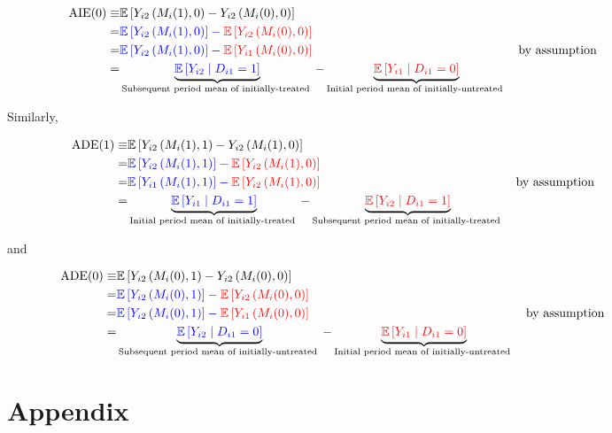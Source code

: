 \documentclass[10pt]{article}
\begin{document}
\begin{align}
    \text{AIE}(0) \equiv &\mathbb{E}\left[Y_{i 2}\left(M_i(1), 0\right)-Y_{i 2}\left(M_i(0), 0\right)\right] \\
    = &\color{blue}{\mathbb{E}\left[Y_{i 2}\left(M_i(1), 0\right)\right]} - \color{red}{\mathbb{E}\left[Y_{i 2}\left(M_i(0), 0\right)\right]} \\
    = &\color{blue}{\mathbb{E}\left[Y_{i 2}\left(M_i(1), 0\right)\right]} - \color{red}{\mathbb{E}\left[Y_{i 1}\left(M_i(0), 0\right)\right]} && \parbox[t]{5cm}{\raggedright by assumption} \\
    = &\underbrace{\color{blue}{\mathbb{E}\left[Y_{i 2} \mid D_{i 1}=1\right]}}_{\text {Subsequent period mean of initially-treated }}-\underbrace{\color{red}{\mathbb{E}\left[Y_{i 1} \mid D_{i 1}=0\right]}}_{\text {Initial period mean of initially-untreated }}
\end{align}

Similarly, 

\begin{align}
    \text{ADE}(1) \equiv &\mathbb{E}\left[Y_{i 2}\left(M_i(1), 1\right)-Y_{i 2}\left(M_i(1), 0\right)\right] \\
    = &\color{blue}{\mathbb{E}\left[Y_{i 2}\left(M_i(1), 1\right)\right]} - \color{red}{\mathbb{E}\left[Y_{i 2}\left(M_i(1), 0\right)\right]} \\
    = &\color{blue}{\mathbb{E}\left[Y_{i 1}\left(M_i(1), 1\right)\right]} - \color{red}{\mathbb{E}\left[Y_{i 2}\left(M_i(1), 0\right)\right]} && \parbox[t]{5cm}{\raggedright by assumption} \\
    = &\underbrace{\color{blue}{\mathbb{E}\left[Y_{i 1} \mid D_{i 1}=1\right]}}_{\text {Initial period mean of initially-treated }}-\underbrace{\color{red}{\mathbb{E}\left[Y_{i 2} \mid D_{i 1}=1\right]}}_{\text {Subsequent period mean of initially-treated }}
\end{align}

and 

\begin{align}
    \text{ADE}(0) \equiv &\mathbb{E}\left[Y_{i 2}\left(M_i(0), 1\right)-Y_{i 2}\left(M_i(0), 0\right)\right] \\
    = &\color{blue}{\mathbb{E}\left[Y_{i 2}\left(M_i(0), 1\right)\right]} - \color{red}{\mathbb{E}\left[Y_{i 2}\left(M_i(0), 0\right)\right]} \\
    = &\color{blue}{\mathbb{E}\left[Y_{i 2}\left(M_i(0), 1\right)\right]} - \color{red}{\mathbb{E}\left[Y_{i 1}\left(M_i(0), 0\right)\right]} && \parbox[t]{5cm}{\raggedright by assumption} \\
    = &\underbrace{\color{blue}{\mathbb{E}\left[Y_{i 2} \mid D_{i 1}=0\right]}}_{\text {Subsequent period mean of initially-untreated }}-\underbrace{\color{red}{\mathbb{E}\left[Y_{i 1} \mid D_{i 1}=0\right]}}_{\text {Initial period mean of initially-untreated }}
\end{align}



\section{Appendix}
\end{document}
